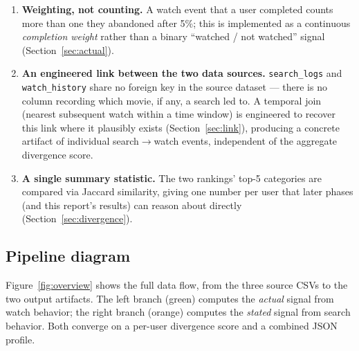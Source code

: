 \documentclass[11pt,a4paper]{article}
\newcommand{\code}[1]{\texttt{#1}}
\begin{document}
\begin{enumerate}[label=(\alph*)]
    \item \textbf{Weighting, not counting.} A watch event that a user completed counts more than
        one they abandoned after 5\%; this is implemented as a continuous \emph{completion
        weight} rather than a binary ``watched / not watched'' signal (Section~\ref{sec:actual}).
    \item \textbf{An engineered link between the two data sources.} \code{search\_logs} and
        \code{watch\_history} share no foreign key in the source dataset --- there is no column
        recording which movie, if any, a search led to. A temporal join (nearest subsequent watch
        within a time window) is engineered to recover this link where it plausibly exists
        (Section~\ref{sec:link}), producing a concrete artifact of individual
        search$\to$watch events, independent of the aggregate divergence score.
    \item \textbf{A single summary statistic.} The two rankings' top-5 categories are compared via
        Jaccard similarity, giving one number per user that later phases (and this report's
        results) can reason about directly (Section~\ref{sec:divergence}).
\end{enumerate}

\subsection{Pipeline diagram}

Figure~\ref{fig:overview} shows the full data flow, from the three source CSVs to the two output
artifacts. The left branch (green) computes the \emph{actual} signal from watch behavior; the
right branch (orange) computes the \emph{stated} signal from search behavior. Both converge on a
per-user divergence score and a combined JSON profile.
\end{document}
